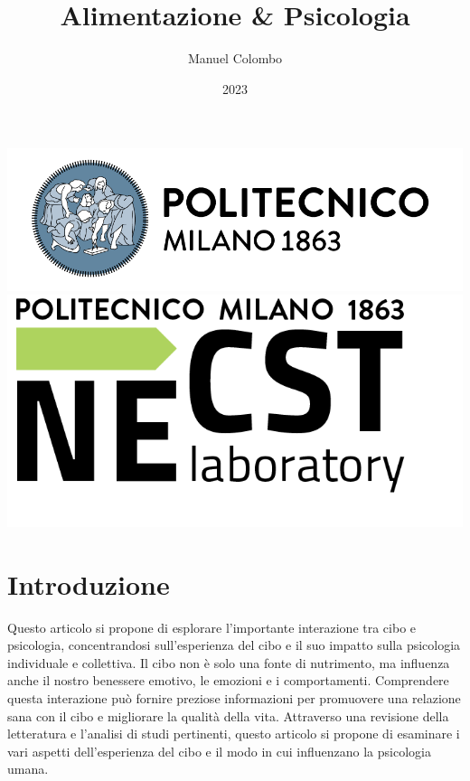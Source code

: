 \documentclass[12pt,oneside,a4paper]{article}
\title{\textbf{Alimentazione \& Psicologia}}
\author{Manuel Colombo}
\date{2023}
\begin{document}
\begin{titlepage}
	\centering
	\clearpage
	\maketitle
	\thispagestyle{empty}
	\vspace*{1cm}
	\vfill
	\centering
	\includegraphics{logo_polimi.png}\includegraphics{logo_NECST.png}
\end{titlepage}


\section{Introduzione} \label{sec:intro}
Questo articolo si propone di esplorare l'importante interazione tra cibo e psicologia, concentrandosi sull'esperienza del cibo e il suo impatto sulla psicologia individuale e collettiva. Il cibo non è solo una fonte di nutrimento, ma influenza anche il nostro benessere emotivo, le emozioni e i comportamenti. Comprendere questa interazione può fornire preziose informazioni per promuovere una relazione sana con il cibo e migliorare la qualità della vita. Attraverso una revisione della letteratura e l'analisi di studi pertinenti, questo articolo si propone di esaminare i vari aspetti dell'esperienza del cibo e il modo in cui influenzano la psicologia umana. 
\end{document}
